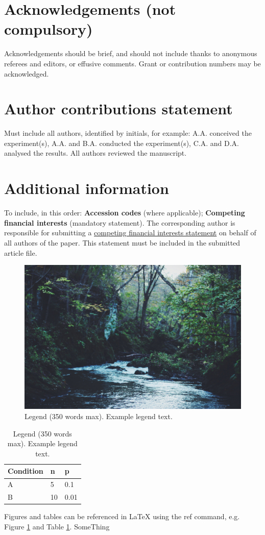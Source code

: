 \documentclass[fleqn,10pt]{wlscirep}%
\begin{document}
\section*{Acknowledgements (not compulsory)}%
%
Acknowledgements should be brief, and should not include thanks to anonymous referees and editors, or effusive comments. Grant or contribution numbers may be acknowledged.%
%
\section*{Author contributions statement}%
%
Must include all authors, identified by initials, for example:%
A.A. conceived the experiment(s),  A.A. and B.A. conducted the experiment(s), C.A. and D.A. analysed the results.  All authors reviewed the manuscript.%
%
\section*{Additional information}%
%
To include, in this order: \textbf{Accession codes} (where applicable); \textbf{Competing financial interests} (mandatory statement).%
%
The corresponding author is responsible for submitting a \href{http://www.nature.com/srep/policies/index.html#competing}{competing financial interests statement} on behalf of all authors of the paper. This statement must be included in the submitted article file.%
%
\begin{figure}[ht]%
\centering%
\includegraphics[width=\linewidth]{stream}%
\caption{Legend (350 words max). Example legend text.}%
\label{fig:stream}%
\end{figure}%
%
\begin{table}[ht]%
\centering%
\begin{tabular}{|l|l|l|}%
\hline%
Condition & n & p \\%
\hline%
A & 5 & 0.1 \\%
\hline%
B & 10 & 0.01 \\%
\hline%
\end{tabular}%
\caption{\label{tab:example}Legend (350 words max). Example legend text.}%
\end{table}%
%
Figures and tables can be referenced in LaTeX using the ref command, e.g. Figure \ref{fig:stream} and Table \ref{tab:example}.%
%
SomeThing%
\end{document}

